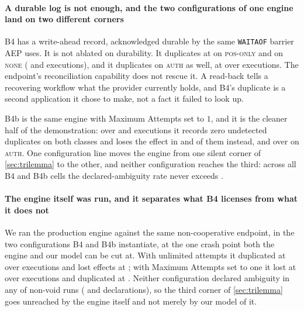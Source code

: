 \paragraph{A durable log is not enough, and the two configurations of one
engine land on two different corners} B4 has a write-ahead record,
acknowledged durable by the same \texttt{WAITAOF} barrier AEP uses. It is not
ablated on durability. It duplicates at \BfourDupPosOnly{} on
\textsc{pos-only} and \BfourDupNoReadback{} on \textsc{none}
(\BfourExecPosOnly{} and \BfourExecNoReadback{} executions), and it duplicates
on \textsc{auth} as well, at \BfourDupAuth{} over \BfourExecAuth{}
executions. The endpoint's
reconciliation capability does not rescue it. A
read-back tells a recovering workflow what the provider currently holds, and
B4's duplicate is a second application it chose to make, not a fact it failed
to look up.

B4b is the same engine with Maximum Attempts set to $1$, and it is the cleaner
half of the demonstration: over \BfourbExecPosOnly{} and
\BfourbExecNoReadback{} executions it records zero undetected
duplicates on both classes and loses the effect in \BfourbLostPosOnly{} and
\BfourbLostNoReadback{} of them instead, and \BfourbLostAuth{} over
\BfourbExecAuth{} on \textsc{auth}. One configuration line moves
the engine from one silent corner of \cref{sec:trilemma} to the other, and
neither configuration reaches the third: across all \BfourFamilyAmbCells{}
B4 and B4b cells the declared-ambiguity rate never exceeds
\BfourFamilyAmbMax{}.

\paragraph{The engine itself was run, and it separates what B4 licenses from
what it does not} We ran the production engine against the same non-cooperative
endpoint, in the two configurations B4 and B4b instantiate, at the one crash
point both the engine and our model can be cut at. With unlimited attempts it
duplicated at \BfiveDup{} over \BfiveExec{} executions and lost effects at
\BfiveLost{}; with Maximum Attempts set to one it lost at \BfivebLost{} over
\BfivebExec{} executions and duplicated at \BfivebDup{}. Neither configuration
declared ambiguity in any of \BfiveRuns{} non-void runs (\BfiveAmb{} and
\BfivebAmb{} declarations), so the third corner of \cref{sec:trilemma} goes
unreached by the engine itself and not merely by our model of it.


